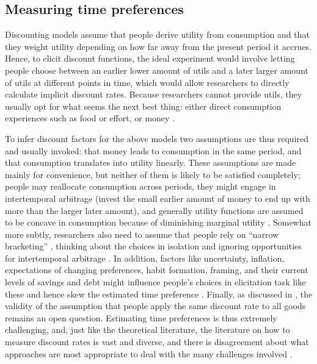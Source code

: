 \documentclass[a4paper, 11pt]{report}
\begin{document}
\subsection{Measuring time preferences}

Discounting models assume that people derive utility from consumption and that they weight utility depending on how far away from the present period it accrues. Hence, to elicit discount functions, the ideal experiment would involve letting people choose between an earlier lower amount of utils and a later larger amount of utils at different points in time, which would allow researchers to directly calculate implicit discount rates. Because researchers cannot provide utils, they usually opt for what seems the next best thing: either direct consumption experiences such as food or effort, or money \citet{frederick2002time,cohenFmeasuring}.

To infer discount factors for the above models two assumptions are thus required and usually invoked: that money leads to consumption in the same period, and that consumption translates into utility linearly. These assumptions are made mainly for convenience, but neither of them is likely to be satisfied completely; people may reallocate consumption across periods, they might engage in intertemporal arbitrage (invest the small earlier amount of money to end up with more than the larger later amount), and generally utility functions are assumed to be concave in consumption because of diminishing marginal utility \citep{frederick2002time,cohenFmeasuring}. Somewhat more subtly, researchers also need to assume that people rely on ``narrow bracketing'' \citep{read1999choice}, thinking about the choices in isolation and ignoring opportunities for intertemporal arbitrage \citep{frederick2002time,read2018intertemporal}. In addition, factors like uncertainty, inflation, expectations of changing preferences, habit formation, framing, and their current levels of savings and debt might influence people's choices in elicitation task like these and hence skew the estimated time preference \citep{frederick2002time}. Finally, as discussed in \citet{read2018intertemporal}, the validity of the assumption that people apply the same discount rate to all goods remains an open question. Estimating time preferences is thus extremely challenging, and, just like the theoretical literature, the literature on how to measure discount rates is vast and diverse, and there is disagreement about what approaches are most appropriate to deal with the many challenges involved \citep{cohenFmeasuring}.
\end{document}
